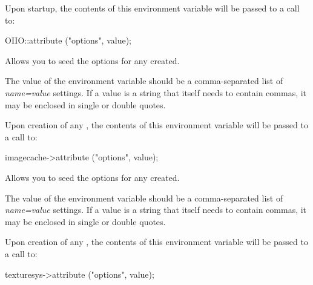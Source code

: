 Upon startup, the contents of this environment variable will be passed
to a call to:
\begin{code}
    OIIO::attribute ("options", value);
\end{code}
\apiend

Allows you to seed the options for any \ImageCache created.

The value of the environment variable should be a comma-separated list of
\emph{name=value} settings. If a value is a string that itself needs to
contain commas, it may be enclosed in single or double quotes.

Upon creation of any \ImageCache, the contents of this environment variable
will be passed to a call to:
\begin{code}
    imagecache->attribute ("options", value);
\end{code}
\apiend

Allows you to seed the options for any \TextureSystem created.

The value of the environment variable should be a comma-separated list of
\emph{name=value} settings. If a value is a string that itself needs to
contain commas, it may be enclosed in single or double quotes.

Upon creation of any \TextureSystem, the contents of this environment variable
will be passed to a call to:
\begin{code}
    texturesys->attribute ("options", value);
\end{code}
\apiend



\chapwidthend
